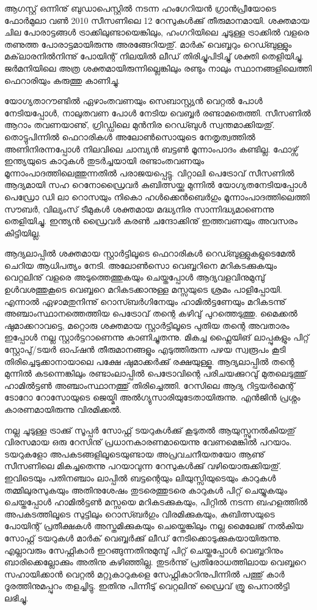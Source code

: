 ﻿
\vskip 2pt

ആഗസ്റ്റ് ഒന്നിനു് ബുഡാപെസ്റ്റില്‍ നടന്ന ഹംഗേറിയന്‍ ഗ്രാന്‍പ്രീയോടെ ഫോര്‍മുലാ വണ്‍ 2010 സീസണിലെ 12 റേസുകള്‍ക്കു് തീരുമാനമായി. ശക്തമായ ചില പോരാട്ടങ്ങള്‍ ട്രാക്കിലുണ്ടായെങ്കിലും, ഹംഗറിയിലെ ചൂടുള്ള ട്രാക്കില്‍ വളരെ തണുത്ത പോരാട്ടമായിരുന്നു അരങ്ങേറിയതു്. മാര്‍ക് വെബ്ബറും റെഡ്ബുള്ളും മക്‌ലാരനില്‍നിന്നു് പോയിന്റ് നിലയില്‍ ലീഡ് തിരിച്ചുപിടിച്ചു് ശക്തി തെളിയിച്ചു. ജര്‍മനിയിലെ അത്ര ശക്തമായിരുന്നില്ലെങ്കിലും രണ്ടും നാലും സ്ഥാനങ്ങളിലെത്തി ഫെറാരിയും കരുത്തു കാണിച്ചു.

യോഗ്യതാറൗണ്ടില്‍ ഏഴാംതവണയും സെബാസ്റ്റ്യന്‍ വെറ്റല്‍ പോള്‍ നേടിയപ്പോള്‍, നാലുതവണ പോള്‍ നേടിയ 
വെബ്ബര്‍ രണ്ടാമതെത്തി. സീസണില്‍ ആറാം തവണയാണു്, ഗ്രിഡ്ഡിലെ മുന്‍നിര റെഡ്ബുള്‍ സ്വന്തമാക്കിയതു്. 
തൊട്ടുപിന്നില്‍ ഫെറാരികള്‍ അലോണ്‍സൊയുടെ നേതൃത്വത്തില്‍ അണിനിരന്നപ്പോള്‍ നിലവിലെ ചാമ്പ്യന്‍ ബട്ടണ്‍ 
മൂന്നാംപാദം കണ്ടില്ല. ഫോഴ്സ് ഇന്ത്യയുടെ കാറുകള്‍ തുടര്‍ച്ചയായി രണ്ടാംതവണയും മൂന്നാംപാദത്തിലെത്തുന്നതില്‍ 
പരാജയപ്പെട്ടു. വിറ്റാലി പെട്രോവ് സീസണില്‍ ആദ്യമായി സഹ റെനോഡ്രൈവര്‍ കുബിത്സയ്ക്കു മുന്നില്‍ 
യോഗ്യതനേടിയപ്പോള്‍ പെഡ്രോ ഡി ലാ റൊസയും നികൊ ഹള്‍ക്കെന്‍ബെര്‍ഗും മൂന്നാംപാദത്തിലെത്തി സൗബര്‍, 
വില്യംസ് ടീമുകള്‍ ശക്തമായ മദ്ധ്യനിര സാന്നിദ്ധ്യമാണെന്നു തെളിയിച്ചു. ഇന്ത്യന്‍ ഡ്രൈവര്‍ കരണ്‍ ചന്ദോക്കിനു് 
ഇത്തവണയും അവസരം കിട്ടിയില്ല.

ആദ്യലാപ്പില്‍ ശക്തമായ സ്റ്റാര്‍ട്ടിലൂടെ ഫെറാരികള്‍ റെഡ്ബുള്ളുകളുടെമേല്‍ ചെറിയ ആധിപത്യം നേടി. അലോണ്‍സൊ 
വെബ്ബറിനെ മറികടക്കുകയും വെറ്റലിനു് വളരെ അടുത്തെത്തുകയും ചെയ്തപ്പോള്‍ ആദ്യവളവിനുമുമ്പു് ഉള്‍വശത്തുകൂടെ 
വെബ്ബറെ മറികടക്കാനുള്ള മസ്സയുടെ ശ്രമം പാളിപ്പോയി. എന്നാല്‍ ഏഴാമതുനിന്നു് റൊസ്ബര്‍ഗിനേയും ഹാമില്‍ട്ടണേയും
മറികടന്നു് അഞ്ചാംസ്ഥാനത്തെത്തിയ പെട്രോവ് തന്റെ കഴിവു് പുറത്തെടുത്തു. മൈക്കല്‍ ഷുമാക്കറാവട്ടെ, മറ്റൊരു 
ശക്തമായ സ്റ്റാര്‍ട്ടിലൂടെ പുതിയ തന്റെ അവതാരം ഇപ്പോള്‍ നല്ല സ്റ്റാര്‍ട്ടറാണെന്നു കാണിച്ചുതന്നു. മികച്ച ഫ്ലൈയിങ് 
ലാപ്പുകളും പിറ്റ് സ്റ്റോപു്/ടയര്‍ ഓപ്ഷന്‍ തീരുമാനങ്ങളും എടുത്തിരുന്ന പഴയ സ്വരൂപം കൂടി തിരിച്ചെടുക്കാനായാലെ പക്ഷേ 
ഷുമാക്കര്‍ക്കു് രക്ഷയുള്ളൂ. ആദ്യലാപ്പില്‍ തന്റെ മുന്നില്‍ കടന്നെങ്കിലും രണ്ടാംലാപ്പില്‍ പെട്രോവിന്റെ പരിചയക്കുറവു് 
മുതലെടുത്തു് ഹാമില്‍ട്ടണ്‍ അഞ്ചാംസ്ഥാനത്തു് തിരിച്ചെത്തി. റേസിലെ ആദ്യ റിട്ടയര്‍മെന്റ് ടോറോ റോസോയുടെ 
ജെയ്മി അല്‍ഗ്യുസാരിയുടേതായിരുന്നു. എന്‍ജിന്‍ പ്രശ്നം കാരണമായിരുന്നു വിരമിക്കല്‍.

നല്ല ചൂടുള്ള ട്രാക്കു് സൂപ്പര്‍ സോഫ്റ്റ് ടയറുകള്‍ക്കു് കൂടുതല്‍ ആയുസ്സുനല്‍കിയതു് വിരസമായ ഒരു റേസിനു് 
പ്രധാനകാരണമായെന്നു വേണമെങ്കില്‍ പറയാം. ടയറുകളോ അപകടങ്ങളിലൂടെയുണ്ടായ അപ്രവചനീയതയോ ആണു് 
സീസണിലെ മികച്ചതെന്നു പറയാവുന്ന റേസുകള്‍ക്കു് വഴിയൊരുക്കിയതു്. ഇവിടെയും പതിനഞ്ചാം ലാപ്പില്‍ ബട്ടന്റെയും 
ലിയുസ്സിയുടെയും കാറുകള്‍ തമ്മിലുരസുകയും അതിനുശേഷം തുടരെത്തുടരെ കാറുകള്‍ പിറ്റ് ചെയ്യുകയും ചെയ്തപ്പോള്‍ 
ഹാമില്‍ട്ടണ്‍ മസ്സയെ മറികടക്കുകയും, പിറ്റില്‍ നടന്ന ബഹളത്തില്‍ അപകടത്തിലൂടെ സുട്ടിലും റൊസ്ബര്‍ഗും 
വിരമിക്കുകയും, കുബിത്സയുടെ പോയിന്റ് പ്രതീക്ഷകള്‍ അസ്തമിക്കുകയും ചെയ്തെങ്കിലും നല്ല മൈലേജ് നല്‍കിയ സോഫ്റ്റ് 
ടയറുകള്‍ മാര്‍ക് വെബ്ബര്‍ക്കു് ലീഡ് നേടിക്കൊടുക്കുകയായിരുന്നു. എല്ലാവരും സേഫ്റ്റികാര്‍ ഇറങ്ങുന്നതിനുമുമ്പു് പിറ്റ് 
ചെയ്തപ്പോള്‍ വെബ്ബറിനും ബാരിക്കെല്ലോക്കും അതിനു കഴിഞ്ഞില്ല. തുടര്‍ന്നു് പ്രതിരോധത്തിലായ വെബ്ബറെ സഹായിക്കാന്‍ 
വെറ്റല്‍ മറ്റുകാറുകളെ സേഫ്റ്റികാറിനുപിന്നില്‍ പത്തു് കാര്‍ ദൂരത്തിനുമപ്പുറം തളച്ചിട്ടു. ഇതിനു പിന്നീടു് വെറ്റലിനു് ഡ്രൈവ് 
ത്രൂ പെനാല്‍ട്ടി ലഭിച്ചു.

